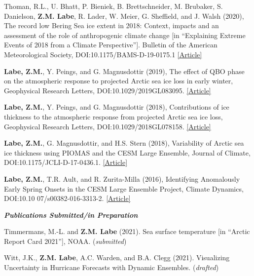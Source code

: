 \documentclass[margin,line,palatino,courier,10pt]{res}
\begin{document}
\begin{resume}
\begin{etaremune}[leftmargin=0in,topsep=0in,parsep=0in]
\item Thoman, R.L., U. Bhatt, P. Bieniek, B. Brettschneider, M. Brubaker, S. Danielson, \textbf{Z.M. Labe}, R. Lader, W. Meier, G. Sheffield, and J. Walsh (2020), The record low Bering Sea ice extent in 2018: Context, impacts and an assessment of the role of anthropogenic climate change [in ``Explaining Extreme Events of 2018 from a Climate Perspective'']. Bulletin of the American Meteorological Society, DOI:10.1175/BAMS-D-19-0175.1 \href{https://journals.ametsoc.org/doi/abs/10.1175/BAMS-D-19-0175.1}{[Article]}
\item \textbf{Labe, Z.M.}, Y. Peings, and G. Magnusdottir (2019), The effect of QBO phase on the atmospheric response to projected Arctic sea ice loss in early winter, Geophysical Research Letters, DOI:10.1029/2019GL083095. \href{https://agupubs.onlinelibrary.wiley.com/doi/10.1029/2019GL083095}{[Article]}
\item \textbf{Labe, Z.M.}, Y. Peings, and G. Magnusdottir (2018), Contributions of ice thickness to the atmospheric response from projected Arctic sea ice loss, Geophysical Research Letters, DOI:10.1029/2018GL078158. \href{https://agupubs.onlinelibrary.wiley.com/doi/10.1029/2018GL078158}{[Article]}
\item \textbf{Labe, Z.M.}, G. Magnusdottir, and H.S. Stern (2018), Variability of Arctic sea ice thickness using PIOMAS and the CESM Large Ensemble, Journal of Climate, DOI:10.1175/JCLI-D-17-0436.1. \href{https://journals.ametsoc.org/doi/abs/10.1175/JCLI-D-17-0436.1}{[Article]}
\item \textbf{Labe, Z.M.}, T.R. Ault, and R. Zurita-Milla (2016), Identifying Anomalously Early Spring Onsets in the CESM Large Ensemble Project, Climate Dynamics, DOI:10.10 07/s00382-016-3313-2. \href{http://link.springer.com/article/10.1007/s00382-016-3313-2}{[Article]}
\end{etaremune}

\textit{\textbf{Publications Submitted/in Preparation}}
\vspace*{-0.1in}\\
\begin{etaremune}[leftmargin=0in,topsep=0in,parsep=0in]
\item Timmermans, M.-L. and \textbf{Z.M. Labe} (2021). Sea surface temperature [in ``Arctic Report Card 2021''], NOAA. (\textit{submitted})
\item Witt, J.K., \textbf{Z.M. Labe}, A.C. Warden, and B.A. Clegg (2021). Visualizing Uncertainty in Hurricane Forecasts with Dynamic Ensembles. (\textit{drafted})
\end{etaremune}


\end{resume}
\end{document}

